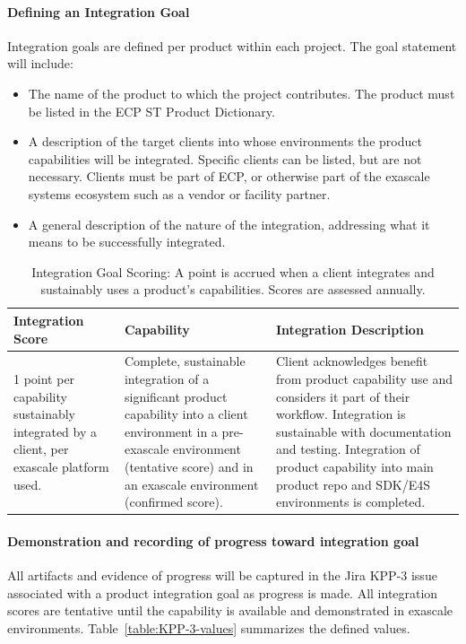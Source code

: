 \paragraph{Defining an Integration Goal}
Integration goals are defined per product within each project.  The goal statement will include:
\begin{itemize}
	\item The name of the product to which the project contributes.  The product must be listed in the ECP ST Product Dictionary.
	\item A description of the target clients into whose environments the product capabilities will be integrated.  Specific clients can be listed, but are not necessary.  Clients must be part of ECP, or otherwise part of the exascale systems ecosystem such as a vendor or facility partner.   
	\item A general description of the nature of the integration, addressing what it means to be successfully integrated.
\end{itemize}

\begin{table}[h!]
	\begin{tabular}{|L{1.5in}|L{2.0in}|L{2.5in}|}\hline
		Integration Score & Capability & Integration Description\\ point per capability sustainably integrated by a client, per exascale platform used. &
		Complete, sustainable integration of a significant product capability into a client environment in a pre-exascale environment (tentative score) and in an exascale environment (confirmed score). &
		Client acknowledges benefit from product capability use and considers it part of their workflow. Integration is sustainable with documentation and testing. Integration of product capability into main product repo and SDK/E4S environments is completed.\\\hline
	\end{tabular}
	\caption{\label{table:KPP-3-scoring} Integration Goal Scoring: A point is accrued when a client integrates and sustainably uses a product's capabilities.  Scores are assessed annually.}
\end{table}


\paragraph{Demonstration and recording of progress toward integration goal}
All artifacts and evidence of progress will be captured in the Jira KPP-3 issue associated with a product integration goal as progress is made.  All integration scores are tentative until the capability is available and demonstrated in exascale environments.  Table~\ref{table:KPP-3-values} summarizes the defined values.

